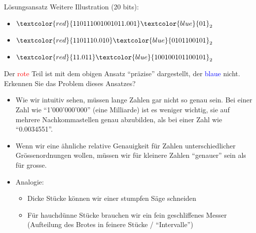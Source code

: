 \begin{frame}{Lösungsansatz}
Weitere Illustration (20 bits):
\begin{itemize}
\tiny
    \item $\textcolor{red}{110111001001011.001 }\textcolor{blue}{01}_2$
    \item $\textcolor{red}{1101110.010}\textcolor{blue}{0101100101}_2$
    \item $\textcolor{red}{11.011}\textcolor{blue}{100100101100101}_2$
\end{itemize}\normalsize
Der \textcolor{red}{rote} Teil ist mit dem obigen Ansatz \enquote{präzise} dargestellt, der \textcolor{blue}{blaue} nicht. Erkennen Sie das Problem dieses Ansatzes?

\begin{itemize}
    \item Wie wir intuitiv sehen, müssen lange Zahlen gar nicht so genau sein. Bei einer Zahl wie \enquote{1'000'000'000} (eine Milliarde) ist es weniger wichtig, sie auf mehrere Nachkommastellen genau abzubilden, als bei einer Zahl wie \enquote{0.0034551}. 
    \item Wenn wir eine ähnliche relative Genauigkeit für Zahlen unterschiedlicher Grössenordnungen wollen, müssen wir für kleinere Zahlen \enquote{genauer} sein als für grosse.
    \item Analogie: 
    \begin{itemize}
        \item {} Dicke Stücke können wir einer stumpfen Säge schneiden 
        \item {} Für hauchdünne Stücke brauchen wir ein fein geschliffenes Messer (Aufteilung des Brotes in feinere Stücke / \enquote{Intervalle})
    \end{itemize}
\end{itemize}
\end{frame}

